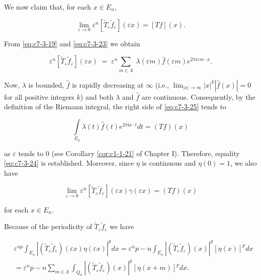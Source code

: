 We now claim that, for each $x \in E_n$,

\begin{equation}\label{eq:c7-3-24}
\lim_{\varepsilon\to0}\varepsilon^{n}[\widetilde{T}_{\varepsilon}\widetilde{f}_{\varepsilon}](\varepsilon x)=[T f](x).
\end{equation}

From \eqref{eq:c7-3-19} and \eqref{eq:c7-3-23} we obtain

\begin{equation}\label{eq:c7-3-25}
\varepsilon^{n}[\widetilde{T}_{\varepsilon}\widetilde{f}_{\varepsilon}](\varepsilon x)\;=\;\varepsilon^{n}\sum_{m\in\Lambda}\;\lambda(\varepsilon m)\widehat{f}(\varepsilon m)e^{2\pi i\varepsilon m\cdot x}.
\end{equation}

Now, $\lambda$ is bounded, $\hat{f}$ is rapidly decreasing at $\infty$ (i.e., $\lim_{|x|\to\infty}|x|^{k}|\hat{f}(x)|=0$ for all positive integers $k$) and both $\lambda$ and $\hat{f}$ are continuous. Consequently, by the definition of the Riemann integral, the right side of \eqref{eq:c7-3-25} tends to

\[
\int\limits_{E_{n}}\lambda(t)\hat{f}(t)e^{2\pi\mathrm{i}x\cdot t}dt=(Tf)(x)
\]

as $\varepsilon$ tends to 0 (see Corollary \ref{cor:c1-1-21} of Chapter I). Therefore, equality \eqref{eq:c7-3-24} is established. Moreover, since $\eta$ is continuous and $\eta(0) = 1$, we also have

\begin{equation}\label{eq:c7-3-26}
\lim_{\varepsilon\to0}\varepsilon^{n}[\widetilde{T}_{\varepsilon}\widetilde{f}_{\varepsilon}](\varepsilon x)\gamma(\varepsilon x)=(T f)(x)
\end{equation}

for each $x \in E_n$.

Because of the periodicity of $\tilde{T}_{\varepsilon}\tilde{f}_{\varepsilon}$ we have

\[
\begin{aligned}&{\varepsilon^{n p}\int_{E_{n}}|(\widetilde{T}_{\varepsilon}\widetilde{f}_{\varepsilon})(\varepsilon x)\eta(\varepsilon x)|^{p}d x}{{}=\varepsilon^np-n\int_{E_{n}}|(\widetilde{T}_{\varepsilon}\widetilde{f}_{\varepsilon})(x)|^{p}[\eta(x)]^{p}d x}\\&{{}=\varepsilon^np-n\sum_{m\in\Lambda}\int_{Q_{n}}|(\widetilde{T}_{\varepsilon}\widetilde{f}_{\varepsilon})(x)|^{p}[\eta(x+m)]^{p}d x.}\\ \end{aligned}
\]

